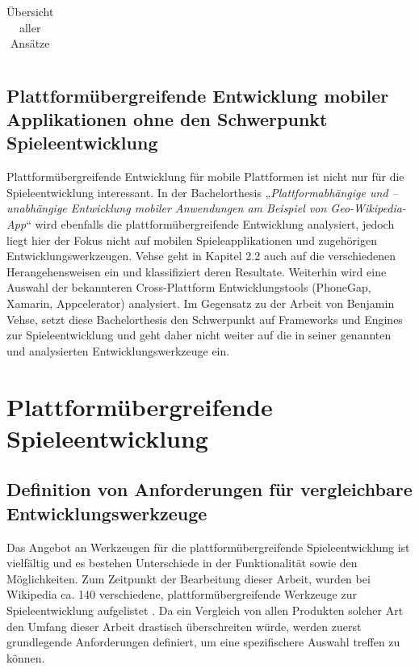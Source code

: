 \begin{table}[htbp]
{\begin{tabular}{|c|c|p{5cm}|p{6cm}|p{}|}
		\end{tabular}
	}
	\caption{Übersicht aller Ansätze}
	\label{table_all_approaches}
\end{table}

\section{Plattformübergreifende Entwicklung mobiler Applikationen ohne den Schwerpunkt Spieleentwicklung}
Plattformübergreifende Entwicklung für mobile Plattformen ist nicht nur für die Spieleentwicklung interessant.
In der Bachelorthesis „\textit{Plattformabhängige und –unabhängige Entwicklung mobiler Anwendungen am Beispiel von Geo-Wikipedia-App}“ \citep{cross_plattform_development_vehse} wird ebenfalls die plattformübergreifende Entwicklung analysiert, jedoch liegt hier der Fokus nicht auf mobilen Spieleapplikationen und zugehörigen Entwicklungswerkzeugen. Vehse geht in Kapitel 2.2 auch auf die verschiedenen Herangehensweisen ein und klassifiziert deren Resultate. Weiterhin wird eine Auswahl der bekannteren Cross-Plattform Entwicklungstools (PhoneGap, Xamarin, Appcelerator) analysiert. Im Gegensatz zu der Arbeit von Benjamin Vehse, setzt diese Bachelorthesis den Schwerpunkt auf Frameworks und Engines zur Spieleentwicklung und geht daher nicht weiter auf die in seiner genannten und analysierten Entwicklungswerkzeuge ein.


\chapter{Plattformübergreifende Spieleentwicklung}

\section{Definition von Anforderungen für vergleichbare Entwicklungswerkzeuge}
Das Angebot an Werkzeugen für die plattformübergreifende Spieleentwicklung ist vielfältig und es bestehen Unterschiede in der Funktionalität sowie den Möglichkeiten. Zum Zeitpunkt der Bearbeitung dieser Arbeit, wurden bei Wikipedia ca. 140 verschiedene, plattformübergreifende Werkzeuge zur Spieleentwicklung aufgelistet \citep{list_of_game_engines}. Da ein Vergleich von allen Produkten solcher Art den Umfang dieser Arbeit drastisch überschreiten würde, werden zuerst grundlegende Anforderungen definiert, um eine spezifischere Auswahl treffen zu können.
 

